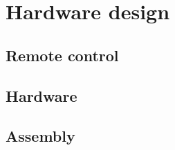 \section{Hardware design}

\subsection{Remote control}

\subsection{Hardware}

\subsection{Assembly}